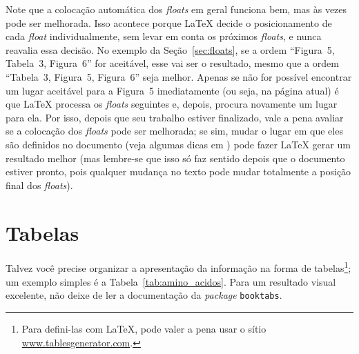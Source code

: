 Note que a colocação automática dos \emph{floats} em geral funciona bem,
mas às vezes pode ser melhorada. Isso acontece porque \LaTeX{} decide o
posicionamento de cada \emph{float} individualmente, sem levar em conta
os próximos \emph{floats}, e nunca reavalia essa decisão. No exemplo da
Seção~\ref{sec:floats}, se a ordem ``Figura~5, Tabela~3, Figura~6'' for
aceitável, esse vai ser o resultado, mesmo que a ordem ``Tabela~3, Figura~5,
Figura~6'' seja melhor. Apenas se não for possível encontrar um lugar
aceitável para a Figura~5 imediatamente (ou seja, na página atual) é que
\LaTeX{} processa os \emph{floats} seguintes e, depois, procura novamente
um lugar para ela. Por isso, depois que seu trabalho estiver finalizado,
vale a pena avaliar se a colocação dos \emph{floats} pode ser melhorada;
se sim, mudar o lugar em que eles são definidos no documento (veja algumas
dicas em \cite{floats2014}) pode fazer \LaTeX{} gerar um resultado melhor
(mas lembre-se que isso só faz sentido depois que o documento estiver
pronto, pois qualquer mudança no texto pode mudar totalmente a posição
final dos \emph{floats}).

\section{Tabelas}

Talvez você precise organizar a apresentação da informação na forma de
tabelas\footnote{Para defini-las com \LaTeX{}, pode valer a pena
usar o sítio \url{www.tablesgenerator.com}.};
um exemplo simples é a Tabela~\ref{tab:amino_acidos}. Para um resultado visual
excelente, não deixe de ler a documentação da \emph{package} \texttt{booktabs}.



